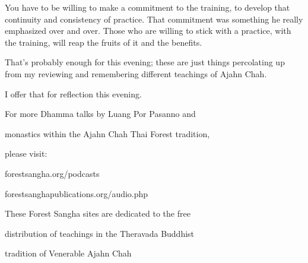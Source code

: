 \documentclass[a4paper,portrait,12pt]{article}
\begin{document}
You have to be willing to make a commitment to the   training,   to
develop   that   continuity   and consistency  of  practice.  That
commitment  was something  he  really  emphasized  over  and  over.
Those  who  are  willing  to  stick  with  a  practice, with the
training, will reap the fruits of it and the benefits. 





That's probably enough for this evening; these are just things
percolating up from my reviewing and remembering different teachings
of Ajahn Chah.


I offer that for reflection this evening.




















For more Dhamma talks by Luang Por Pasanno and 


monastics within the Ajahn Chah Thai Forest tradition, 


please visit:  


 


forestsangha.org/podcasts 


forestsanghapublications.org/audio.php 








These Forest Sangha sites are dedicated to the free 


distribution of teachings in the Theravada Buddhist 


tradition of Venerable Ajahn Chah
\end{document}
